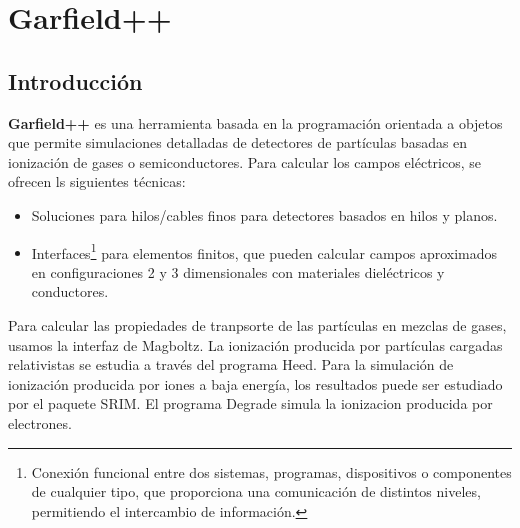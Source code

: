 \chapter{Garfield++}


\section{Introducción}

\textbf{Garfield++} es una herramienta basada en la programación orientada a objetos que permite simulaciones detalladas de detectores de partículas basadas en ionización de gases o semiconductores. Para calcular los campos eléctricos, se ofrecen ls siguientes técnicas: 

\begin{itemize}
    \item Soluciones para hilos/cables finos para detectores basados en hilos y planos. 
    \item Interfaces\footnote{Conexión funcional entre dos sistemas, programas, dispositivos o componentes de cualquier tipo, que proporciona una comunicación de distintos niveles, permitiendo el intercambio de información.} para elementos finitos, que pueden calcular campos aproximados en configuraciones 2 y 3 dimensionales con materiales dieléctricos y conductores. 
\end{itemize}
Para calcular las propiedades de tranpsorte de las partículas en mezclas de gases, usamos la interfaz de Magboltz. La ionización producida por partículas cargadas relativistas se estudia a través del programa Heed. Para la simulación de ionización producida por iones a baja energía, los resultados puede ser estudiado por el paquete SRIM. El programa Degrade simula la ionizacion producida por electrones. 


